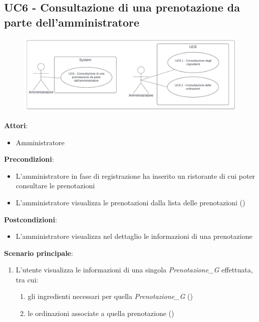\subsection{UC6 - Consultazione di una prenotazione da parte dell'amministratore}\label{usecase:6}
\begin{figure}[H]
  \centering
  \includegraphics[width=1\textwidth]{ucd/UCD6_new.png}
\end{figure}
\textbf{Attori}:
\begin{itemize}
    \item Amministratore
\end{itemize}
\textbf{Precondizioni}:
\begin{itemize}
    \item L'amministratore in fase di registrazione ha inserito un ristorante di cui poter consultare le prenotazioni
    \item L'amministratore visualizza le prenotazioni dalla lista delle prenotazioni ()
\end{itemize}
\textbf{Postcondizioni}:
\begin{itemize}
    \item L'amministratore visualizza nel dettaglio le informazioni di una prenotazione
\end{itemize}
\textbf{Scenario principale}:
\begin{enumerate}
    \item L'utente visualizza le informazioni di una singola \textit{Prenotazione_G} effettuata, tra cui:
    \begin{enumerate}
        \item gli ingredienti necessari per quella \textit{Prenotazione_G} ()
        \item le ordinazioni associate a quella prenotazione
        ()
    \end{enumerate}
\end{enumerate}